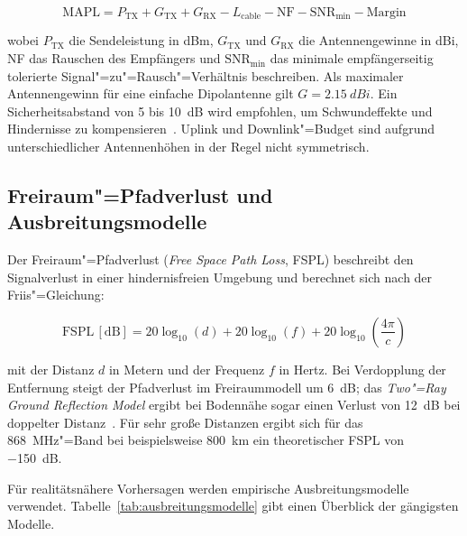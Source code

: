 \begin{equation}
  \text{MAPL} = P_\text{TX} + G_\text{TX} + G_\text{RX} - L_\text{cable}
                - \text{NF} - \text{SNR}_\text{min} - \text{Margin}
  \label{eq:mapl}
\end{equation}

wobei $P_\text{TX}$ die Sendeleistung in \si{dBm}, $G_\text{TX}$ und $G_\text{RX}$
die Antennengewinne in \si{dBi}, NF das Rauschen des Empfängers und
$\text{SNR}_\text{min}$ das minimale empfängerseitig tolerierte Signal"=zu"=Rausch"=Verhältnis
beschreiben. Als maximaler Antennengewinn für eine einfache Dipolantenne gilt
$G = \SI{2.15}{dBi}$. Ein Sicherheitsabstand von 5 bis \SI{10}{\dB} wird empfohlen,
um Schwundeffekte und Hindernisse zu kompensieren~\cite{semtech_lora_basics}.
Uplink und Downlink"=Budget sind aufgrund unterschiedlicher Antennenhöhen in der Regel
nicht symmetrisch.

\subsection{Freiraum"=Pfadverlust und Ausbreitungsmodelle}
\label{subsec:pfadverlust}

Der Freiraum"=Pfadverlust (\textit{Free Space Path Loss}, FSPL) beschreibt den
Signalverlust in einer hindernisfreien Umgebung und berechnet sich nach der
Friis"=Gleichung:

\begin{equation}
  \text{FSPL} \, [\si{\dB}] = 20 \log_{10}(d) + 20 \log_{10}(f)
                              + 20 \log_{10}\!\left(\frac{4\pi}{c}\right)
  \label{eq:fspl}
\end{equation}

mit der Distanz $d$ in Metern und der Frequenz $f$ in Hertz. Bei Verdopplung der
Entfernung steigt der Pfadverlust im Freiraummodell um \SI{6}{\dB}; das
\textit{Two"=Ray Ground Reflection Model} ergibt bei Bodennähe sogar einen Verlust
von \SI{12}{\dB} bei doppelter Distanz~\cite{dobkin2012rf}. Für sehr große Distanzen
ergibt sich für das \SI{868}{\MHz}"=Band bei beispielsweise \SI{800}{\km} ein
theoretischer FSPL von \SI{-150}{\dB}.

Für realitätsnähere Vorhersagen werden empirische Ausbreitungsmodelle verwendet.
Tabelle~\ref{tab:ausbreitungsmodelle} gibt einen Überblick der gängigsten Modelle.

